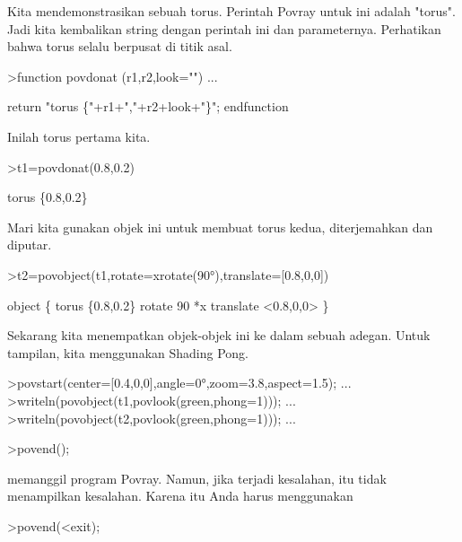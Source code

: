 \documentclass{article}
\begin{document}
\begin{eulernotebook}
\begin{eulercomment}
\begin{eulercomment}
\begin{eulercomment}
Kita mendemonstrasikan sebuah torus. Perintah Povray untuk ini adalah
"torus". Jadi kita kembalikan string dengan perintah ini dan
parameternya. Perhatikan bahwa torus selalu berpusat di titik asal.
\end{eulercomment}
\begin{eulerprompt}
>function povdonat (r1,r2,look="") ...
\end{eulerprompt}
\begin{eulerudf}
    return "torus \{"+r1+","+r2+look+"\}";
  endfunction
\end{eulerudf}
\begin{eulercomment}
Inilah torus pertama kita.
\end{eulercomment}
\begin{eulerprompt}
>t1=povdonat(0.8,0.2)
\end{eulerprompt}
\begin{euleroutput}
  torus \{0.8,0.2\}
\end{euleroutput}
\begin{eulercomment}
Mari kita gunakan objek ini untuk membuat torus kedua, diterjemahkan
dan diputar.
\end{eulercomment}
\begin{eulerprompt}
>t2=povobject(t1,rotate=xrotate(90°),translate=[0.8,0,0])
\end{eulerprompt}
\begin{euleroutput}
  object \{ torus \{0.8,0.2\}
   rotate 90 *x 
   translate <0.8,0,0>
   \}
\end{euleroutput}
\begin{eulercomment}
Sekarang kita menempatkan objek-objek ini ke dalam sebuah adegan.
Untuk tampilan, kita menggunakan Shading Pong.
\end{eulercomment}
\begin{eulerprompt}
>povstart(center=[0.4,0,0],angle=0°,zoom=3.8,aspect=1.5); ...
>writeln(povobject(t1,povlook(green,phong=1))); ...
>writeln(povobject(t2,povlook(green,phong=1))); ...
\end{eulerprompt}
\begin{eulerttcomment}
 >povend();
\end{eulerttcomment}
\begin{eulercomment}
memanggil program Povray. Namun, jika terjadi kesalahan, itu tidak
menampilkan kesalahan. Karena itu Anda harus menggunakan

\end{eulercomment}
\begin{eulerttcomment}
 >povend(<exit);
\end{eulerttcomment}
\begin{eulercomment}


\end{eulercomment}
\end{eulercomment}
\end{eulercomment}
\end{eulernotebook}
\end{document}
